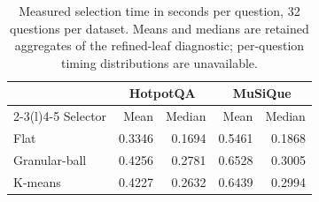 \begin{table}[!htbp]
\centering\small
\caption{Measured selection time in seconds per question, 32 questions per dataset. Means and medians are retained aggregates of the refined-leaf diagnostic; per-question timing distributions are unavailable.}\label{tab:cost}
\begin{tabular}{@{}lrrrr@{}}\toprule
& \multicolumn{2}{c}{HotpotQA} & \multicolumn{2}{c}{MuSiQue} \\ \cmidrule(lr){2-3}\cmidrule(l){4-5}
Selector & Mean & Median & Mean & Median \\
\midrule
Flat & 0.3346 & 0.1694 & 0.5461 & 0.1868 \\
Granular-ball & 0.4256 & 0.2781 & 0.6528 & 0.3005 \\
K-means & 0.4227 & 0.2632 & 0.6439 & 0.2994 \\
\bottomrule\end{tabular}
\end{table}
